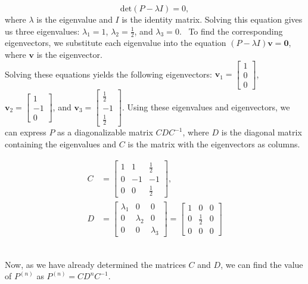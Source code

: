 \documentclass[a4paper,12pt]{article}
\begin{document}
\[
\text{det}(P - \lambda I) = 0,
\]
where $\lambda$ is the eigenvalue and $I$ is the identity matrix. Solving this equation gives us three eigenvalues: $\lambda_1 = 1$, $\lambda_2 = \frac{1}{2}$, and $\lambda_3 = 0$.
\
To find the corresponding eigenvectors, we substitute each eigenvalue into the equation $(P - \lambda I)\mathbf{v} = \mathbf{0}$, where $\mathbf{v}$ is the eigenvector. 
\newpage
\ \\
Solving these equations yields the following eigenvectors: $\mathbf{v}_1 = \begin{bmatrix} 1 \\ 0 \\ 0 \end{bmatrix}$, $\mathbf{v}_2 = \begin{bmatrix} 1 \\ -1 \\ 0 \end{bmatrix}$, and $\mathbf{v}_3 = \begin{bmatrix} \frac{1}{2} \\ -1 \\ \frac{1}{2} \end{bmatrix}$.
Using these eigenvalues and eigenvectors, we can express $P$ as a diagonalizable matrix $CDC^{-1}$, where $D$ is the diagonal matrix containing the eigenvalues and $C$ is the matrix with the eigenvectors as columns.


\begin{align*}
C &= \begin{bmatrix} 1 & 1 & \frac{1}{2} \\ 0 & -1 & -1 \\ 0 & 0 & \frac{1}{2} \end{bmatrix}, \\
D &= \begin{bmatrix} \lambda_1 & 0 & 0 \\ 0 & \lambda_2 & 0 \\ 0 & 0 & \lambda_3 \end{bmatrix} = \begin{bmatrix} 1 & 0 & 0 \\ 0 & \frac{1}{2} & 0 \\ 0 & 0 & 0 \end{bmatrix}
\end{align*}

\ \\
Now, as we have already determined the matrices $C$ and $D$, we can find the value of $P^{(n)}$ as $P^{(n)} = CD^nC^{-1}$.
\end{document}
